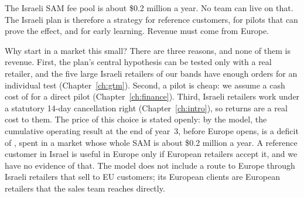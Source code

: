 \begin{insightbox}
The Israeli SAM fee pool is about \$0.2 million a year. No team can live on that. The Israeli plan is therefore a strategy for reference customers, for pilots that can prove the effect, and for early learning. Revenue must come from Europe.
\end{insightbox}

Why start in a market this small? There are three reasons, and none of them is revenue. First, the plan's central hypothesis can be tested only with a real retailer, and the five large Israeli retailers of our bands have enough orders for an individual test (Chapter~\ref{ch:gtm}). Second, a pilot is cheap: we assume a cash cost of  for a direct pilot (Chapter~\ref{ch:finance}). Third, Israeli retailers work under a statutory 14-day cancellation right (Chapter~\ref{ch:intro}), so returns are a real cost to them. The price of this choice is stated openly: by the model, the cumulative operating result at the end of year~3, before Europe opens, is a deficit of , spent in a market whose whole SAM is about \$0.2 million a year. A reference customer in Israel is useful in Europe only if European retailers accept it, and we have no evidence of that. The model does not include a route to Europe through Israeli retailers that sell to EU customers; its European clients are European retailers that the sales team reaches directly.

